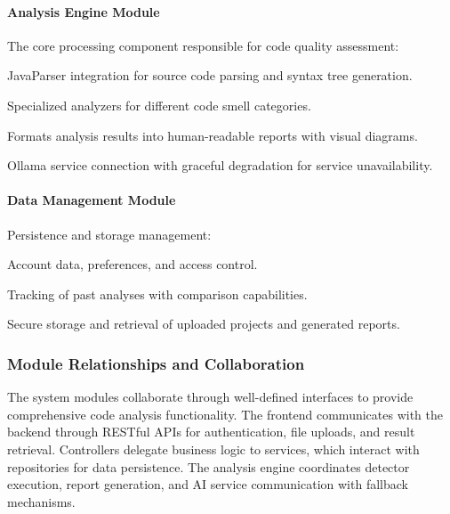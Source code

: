 \documentclass[12pt,a4paper]{article}
\begin{document}
    \paragraph{Analysis Engine Module}

    The core processing component responsible for code quality assessment:

    \begin{description}[font=\bfseries, leftmargin=0.5in]
        \item[AST Parser] JavaParser integration for source code parsing and syntax tree generation.

        \item[Detector Components] Specialized analyzers for different code smell categories.

        \item[Report Generator] Formats analysis results into human-readable reports with visual diagrams.

        \item[AI Integration] Ollama service connection with graceful degradation for service unavailability.
    \end{description}

    \paragraph{Data Management Module}

    Persistence and storage management:

    \begin{description}[font=\bfseries, leftmargin=0.5in]
        \item[User Management] Account data, preferences, and access control.

        \item[Analysis History] Tracking of past analyses with comparison capabilities.

        \item[File Management] Secure storage and retrieval of uploaded projects and generated reports.
    \end{description}

    \subsubsection{Module Relationships and Collaboration}

    The system modules collaborate through well-defined interfaces to provide comprehensive code analysis functionality. The frontend communicates with the backend through RESTful APIs for authentication, file uploads, and result retrieval. Controllers delegate business logic to services, which interact with repositories for data persistence. The analysis engine coordinates detector execution, report generation, and AI service communication with fallback mechanisms.
\end{document}
